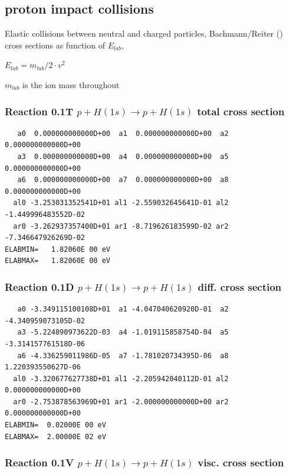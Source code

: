 \documentclass[12pt,dvips]{article}
\begin{document}
\subsection{proton impact collisions}\label{sect1.1}
\bigskip
Elastic collisions between neutral and charged particles,
Bachmann/Reiter (\cite{kn:Bachmann})
cross sections as function of $E_{lab}$,

$E_{lab} = m_{lab}/2 \cdot v^2$

$m_{lab}$ is the ion mass throughout

\subsubsection{
Reaction 0.1T $p + H (1s) \rightarrow p + H (1s) $ total cross
section}

\begin{small}\begin{verbatim}
   a0  0.000000000000D+00  a1  0.000000000000D+00  a2  0.000000000000D+00
   a3  0.000000000000D+00  a4  0.000000000000D+00  a5  0.000000000000D+00
   a6  0.000000000000D+00  a7  0.000000000000D+00  a8  0.000000000000D+00
  al0 -3.253031352541D+01 al1 -2.559032645641D-01 al2 -1.449996483552D-02
  ar0 -3.262937357400D+01 ar1 -8.719626183599D-02 ar2 -7.346647926269D-02
ELABMIN=   1.82060E 00 eV
ELABMAX=   1.82060E 00 eV
\end{verbatim}\end{small}



\subsubsection{
Reaction 0.1D    $ p + H (1s) \rightarrow p + H (1s)$  diff. cross
section}


\begin{small}\begin{verbatim}
   a0 -3.349115100108D+01  a1 -4.047040620920D-01  a2 -4.340959073105D-02
   a3 -5.224890973622D-03  a4 -1.019115858754D-04  a5 -3.314157761518D-06
   a6 -4.336259011986D-05  a7 -1.781020734395D-06  a8  1.220393550627D-06
  al0 -3.320677627738D+01 al1 -2.205942040112D-01 al2  0.000000000000D+00
  ar0 -2.753878563969D+01 ar1 -2.000000000000D+00 ar2  0.000000000000D+00
ELABMIN=  0.02000E 00 eV
ELABMAX=  2.00000E 02 eV
\end{verbatim}\end{small}


\subsubsection{
Reaction 0.1V    $p + H (1s) \rightarrow p + H (1s)$ visc. cross section
}
\end{document}
